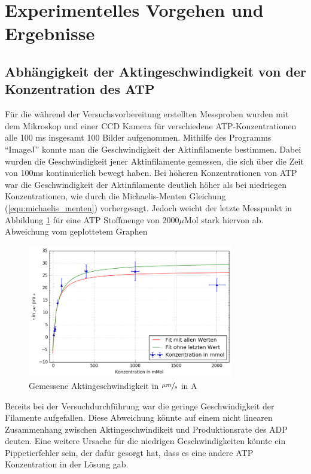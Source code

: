 \section{Experimentelles Vorgehen und Ergebnisse}
\subsection{Abhängigkeit der Aktingeschwindigkeit von der Konzentration des ATP}
Für die während der Versuchsvorbereitung erstellten Messproben wurden mit dem Mikroskop und einer CCD Kamera für verschiedene ATP-Konzentrationen alle
100 ms insgesamt 100 Bilder aufgenommen. Mithilfe des Programms "`ImageJ"' konnte man die Geschwindigkeit
der Aktinfilamente bestimmen. Dabei wurden die Geschwindigkeit jener Aktinfilamente gemessen, die
sich über die Zeit von 100ms kontinuierlich bewegt haben. Bei höheren Konzentrationen von ATP war die
Geschwindigkeit der Aktinfilamente deutlich höher als bei niedriegen Konzentrationen,
wie durch die Michaelis-Menten Gleichung (\ref{equ:michaelis_menten}) vorhergesagt.
Jedoch weicht der letzte Messpunkt in Abbildung \ref{fig:normal_speed} für eine ATP Stoffmenge von 2000$\mu \text{Mol}$ stark hiervon ab.
Abweichung vom geplottetem Graphen 
\begin{figure}[h]
  \centering
  \includegraphics[width=0.8\textwidth]{bilder/both_fits.png}
  \caption{Gemessene Aktingeschwindigkeit in $\sfrac{\mu m}{s}$ in A}
  \label{fig:normal_speed}
\end{figure}
Bereits bei der Versuchdurchführung war die geringe Geschwindigkeit der Filamente aufgefallen.
Diese Abweichung könnte auf einem nicht linearen Zusammenhang zwischen
Aktingeschwindikeit und Produktionsrate des ADP deuten.
Eine weitere Ursache für die niedrigen Geschwindigkeiten könnte ein Pippetierfehler sein,
der dafür gesorgt hat, dass es eine andere ATP Konzentration in der Lösung gab.\newline 
